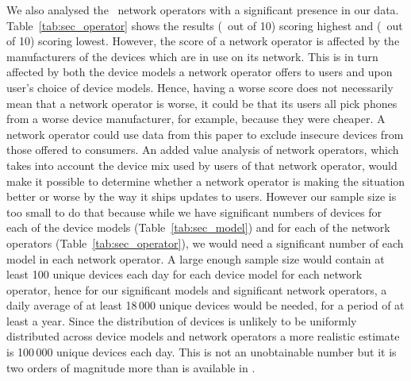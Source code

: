 We also analysed the \daNumSigOperators\ network operators with a significant presence in our data.
Table~\ref{tab:sec_operator} shows the results \emph{\daSecScoreBestoperator} (\daSecScoreBestoperatorScore\ out of 10) scoring highest and \emph{\daSecScoreWorstoperator} (\daSecScoreWorstoperatorScore\ out of 10) scoring lowest.
However, the score of a network operator is affected by the manufacturers of the devices which are in use on its network.
This is in turn affected by both the device models a network operator offers to users and upon user's choice of device models.
Hence, having a worse score does not necessarily mean that a network operator is worse, it could be that its users all pick phones from a worse device manufacturer, for example, because they were cheaper.
A network operator could use data from this paper to exclude insecure devices from those offered to consumers.
An added value analysis of network operators, which takes into account the device mix used by users of that network operator, would make it possible to determine whether a network operator is making the situation better or worse by the way it ships updates to users.
However our sample size is too small to do that because while we have significant numbers of devices for each of the device models (Table~\ref{tab:sec_model}) and for each of the network operators (Table~\ref{tab:sec_operator}), we would need a significant number of each model in each network operator.
A large enough sample size would contain at least 100 unique devices each day for each device model for each network operator, hence for our \daNumSigModels significant models and \daNumSigOperators significant network operators, a daily average of at least 18\,000 unique devices would be needed, for a period of at least a year.
Since the distribution of devices is unlikely to be uniformly distributed across device models and network operators a more realistic estimate is 100\,000 unique devices each day.
This is not an unobtainable number but it is two orders of magnitude more than is available in \da.

